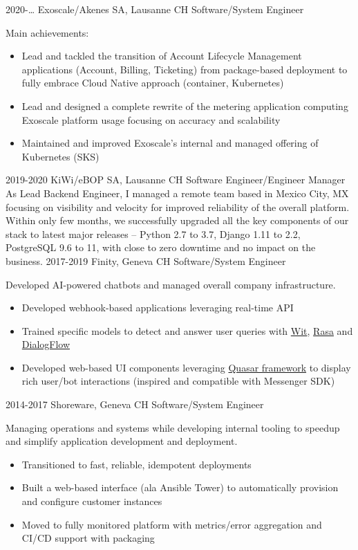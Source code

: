\documentclass[]{friggeri}
\begin{document}
\begin{entrylist}
  \entry
    {2020-…}
    {Exoscale/Akenes SA, Lausanne CH}
    {Software/System Engineer}
    {Main achievements:
    \begin{itemize}
    \item Lead and tackled the transition of Account Lifecycle Management
        applications (Account, Billing, Ticketing) from package-based
        deployment to fully embrace Cloud Native approach (container,
        Kubernetes)
    \item Lead and designed a complete rewrite of the metering application
        computing Exoscale platform usage focusing on accuracy and scalability
    \item Maintained and improved Exoscale's internal and managed offering of
        Kubernetes (\ac{SKS})
    \end{itemize}}
  \entry
    {2019-2020}
    {KiWi/eBOP SA, Lausanne CH}
    {Software Engineer/Engineer Manager}
    {As Lead Backend Engineer, I managed a remote team based in Mexico City, MX
    focusing on visibility and velocity for improved reliability of the
    overall platform. Within only few months, we successfully upgraded all the
    key components of our stack to latest major releases – Python 2.7 to 3.7,
    Django 1.11 to 2.2, PostgreSQL 9.6 to 11, with close to zero downtime and no
    impact on the business.}
  \entry
    {2017-2019}
    {Finity, Geneva CH}
    {Software/System Engineer}
    {Developed \ac{AI}-powered chatbots and managed overall company infrastructure.
    \begin{itemize}
    \item Developed webhook-based applications leveraging real-time \ac{API}
    \item Trained specific models to detect and answer user queries with
        \href{https://wit.ai}{Wit},
        \href{https://rasa.com/}{Rasa} and
        \href{https://cloud.google.com/products/conversational-agents}{DialogFlow}
    \item Developed web-based \ac{UI} components leveraging
        \href{https://quasar.dev/}{Quasar framework} to display
        rich user/bot interactions (inspired and compatible with
        Messenger \ac{SDK})
    \end{itemize}}
  \entry
    {2014-2017}
    {Shoreware, Geneva CH}
    {Software/System Engineer}
    {Managing operations and systems while developing internal tooling to speedup
     and simplify application development and deployment.
    \begin{itemize}
    \item Transitioned to fast, reliable, idempotent deployments
    \item Built a web-based interface (ala Ansible Tower) to automatically
        provision and configure customer instances
    \item Moved to fully monitored platform with metrics/error aggregation
        and \ac{CI}/\ac{CD} support with packaging
    \end{itemize}}
\end{entrylist}
\end{document}
